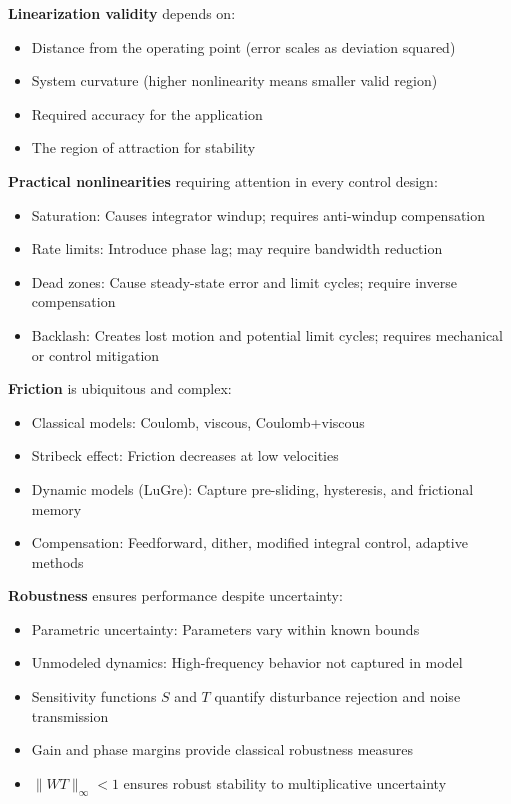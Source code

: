 \textbf{Linearization validity} depends on:
\begin{itemize}
    \item Distance from the operating point (error scales as deviation squared)
    \item System curvature (higher nonlinearity means smaller valid region)
    \item Required accuracy for the application
    \item The region of attraction for stability
\end{itemize}

\textbf{Practical nonlinearities} requiring attention in every control design:
\begin{itemize}
    \item Saturation: Causes integrator windup; requires anti-windup compensation
    \item Rate limits: Introduce phase lag; may require bandwidth reduction
    \item Dead zones: Cause steady-state error and limit cycles; require inverse compensation
    \item Backlash: Creates lost motion and potential limit cycles; requires mechanical or control mitigation
\end{itemize}

\textbf{Friction} is ubiquitous and complex:
\begin{itemize}
    \item Classical models: Coulomb, viscous, Coulomb+viscous
    \item Stribeck effect: Friction decreases at low velocities
    \item Dynamic models (LuGre): Capture pre-sliding, hysteresis, and frictional memory
    \item Compensation: Feedforward, dither, modified integral control, adaptive methods
\end{itemize}

\textbf{Robustness} ensures performance despite uncertainty:
\begin{itemize}
    \item Parametric uncertainty: Parameters vary within known bounds
    \item Unmodeled dynamics: High-frequency behavior not captured in model
    \item Sensitivity functions $S$ and $T$ quantify disturbance rejection and noise transmission
    \item Gain and phase margins provide classical robustness measures
    \item $\|WT\|_\infty < 1$ ensures robust stability to multiplicative uncertainty
\end{itemize}

